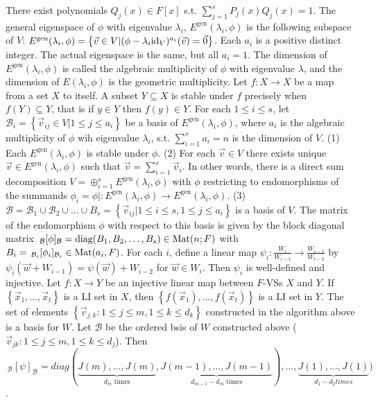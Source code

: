  There exist polynomials $Q_j(x) \in F[x]$ s.t. $\sum_{j=1}^sP_j(x)Q_j(x) = 1$.
 The general eigenspace of $\phi$ with eigenvalue $\lambda_i$, $E^{\mathrm{gen}}(\lambda_i, \phi)$ is the following subspace of $V$: $E^{\mathrm{gen}}(\lambda_i, \phi) = \left\{ \vec{v} \in V | (\phi - \lambda_i \text{id}_V)^{a_i}(\vec{v}) = \vec{0} \right\}$. Each $a_i$ is a positive distinct integer. The actual eigenspace is the same, but all $a_i=1$. The dimension of $E^\mathrm{gen} (\lambda_i, \phi)$ is called the algebraic multiplicity of $\phi$ with eigenvalue $\lambda$, and the dimension of $E(\lambda_i, \phi)$ is the geometric multiplicity. 
 Let $f : X \to X$ be a map from a set $X$ to itself. A subset $Y \subseteq X$ is stable under $f$ precisely when $f(Y) \subseteq Y$, that is if $y \in Y$ then $f(y) \in Y$.
 For each $1 \le i \le s$, let $\mathcal{B}_i = \left\{ \vec{v}_{ij} \in V | 1 \le j \le a_i \right\}$ be a basis of $E^{\mathrm{gen}}(\lambda_i, \phi)$, where $a_i$ is the algebraic multiplicity of $\phi$ wih eigenvalue $\lambda_i$, s.t. $\sum_{i=1}^s a_i = n$ is the dimension of $V$.
(1) Each $E^\mathrm{gen} (\lambda_i, \phi)$ is stable under $\phi$.
(2) For each $\vec{v} \in V$ there exists unique $\vec{v} \in E^\mathrm{gen} (\lambda_i, \phi)$ such that $\vec{v} = \sum_{i=1}^s \vec{v}_i$. In other words, there is a direct sum decomposition $V = \oplus_{i=1}^s E^\mathrm{gen} (\lambda_i, \phi)$ with $\phi$ restricting to endomorphisms of the summands $\phi_i = \phi| : E^\mathrm{gen} (\lambda_i, \phi) \to E^\mathrm{gen} (\lambda_i, \phi)$.
(3) $\mathcal{B} = \mathcal{B}_1 \cup \mathcal{B}_2 \cup \dots \cup B_s = \left\{ \vec{v}_{ij} | 1 \le i \le s, 1 \le j \le a_i \right\}$ is a basis of $V$. The matrix of the endomorphism $\phi$ with respect to this basis is given by the block diagonal matrix $\,_{\mathcal{B}}[\phi]_{\mathcal{B}} = \text{diag}(B_1, B_2, \dots, B_s) \in \text{Mat}(n; F)$ with $B_i = \,_{\mathcal{B}_i}[\phi_i]_{\mathcal{B}_i} \in \text{Mat}(a_i, F)$.
 For each $i$, define a linear map $\psi_i : \frac{W_i}{W_{i-1}} \to \frac{W_{i-1}}{W_{i-2}}$ by $\psi_i(\vec{w} + W_{i-1}) = \psi(\vec{w}) + W_{i-2}$ for $\vec{w} \in W_i$. Then $\psi_i$ is well-defined and injective.
 Let $f : X \to Y$ be an injective linear map between $F$-VSs $X$ and $Y$. If $\left\{ \vec{x}_1, \dots, \vec{x}_t \right\}$ is a LI set in $X$, then $\left\{ f(\vec{x}_1), \dots, f(\vec{x}_t) \right\}$ is a LI set in $Y$.
 The set of elements $\left\{ \vec{v}_{j,k} : 1 \le j \le m, 1 \le k \le d_k \right\}$ constructed in the algorithm above is a basis for $W$.
 Let $\mathcal{B}$ be the ordered bsis of $W$ constructed above ($\vec{v}_{jk} : 1 \le j \le m, 1 \le k \le d_j$). Then
$\,_{\mathcal{B}}[\psi]_{\mathcal{B}} = diag(\underbrace{J(m), \dots, J(m)}_{\text{$d_m$ times}}, \underbrace{J(m-1), \dots, J(m-1)}_{\text{$d_{m-1}-d_m$ times}}), \dots, \underbrace{J(1), \dots, J(1)}_{\text{$d_1 - d_2$} times})$.